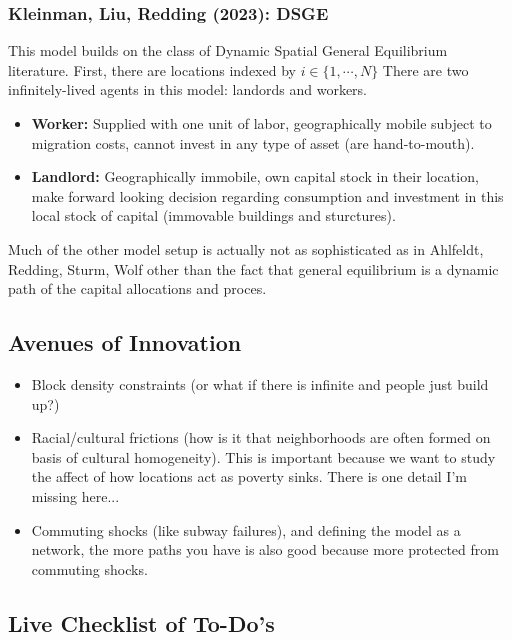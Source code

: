 \documentclass[11pt,english]{article}
\begin{document}
\subsubsection{Kleinman, Liu, Redding (2023): DSGE\cite{Kleinman2023}}

This model builds on the class of Dynamic Spatial General Equilibrium literature. First, there are locations indexed by $i\in \{1, \cdots, N\}$ There are two infinitely-lived agents in this model: landords and workers. 
\begin{itemize}
\item \textbf{Worker:} Supplied with one unit of labor, geographically mobile subject to migration costs, cannot invest in any type of asset (are hand-to-mouth).

\item \textbf{Landlord:} Geographically immobile, own capital stock in their location, make forward looking decision regarding consumption and investment in this local stock of capital (immovable buildings and sturctures).
\end{itemize}

Much of the other model setup is actually not as sophisticated as in Ahlfeldt, Redding, Sturm, Wolf other than the fact that general equilibrium is a dynamic path of the capital allocations and proces.

\subsection{Avenues of Innovation}

\begin{itemize}
\item Block density constraints (or what if there is infinite and people just build up?)

\item Racial/cultural frictions (how is it that neighborhoods are often formed on basis of cultural homogeneity). This is important because we want to study the affect of how locations act as poverty sinks. There is one detail I'm missing here...

\item Commuting shocks (like subway failures), and defining the model as a network, the more paths you have is also good because more protected from commuting shocks.
 
\end{itemize}

\subsection{Live Checklist of To-Do's}
\end{document}
